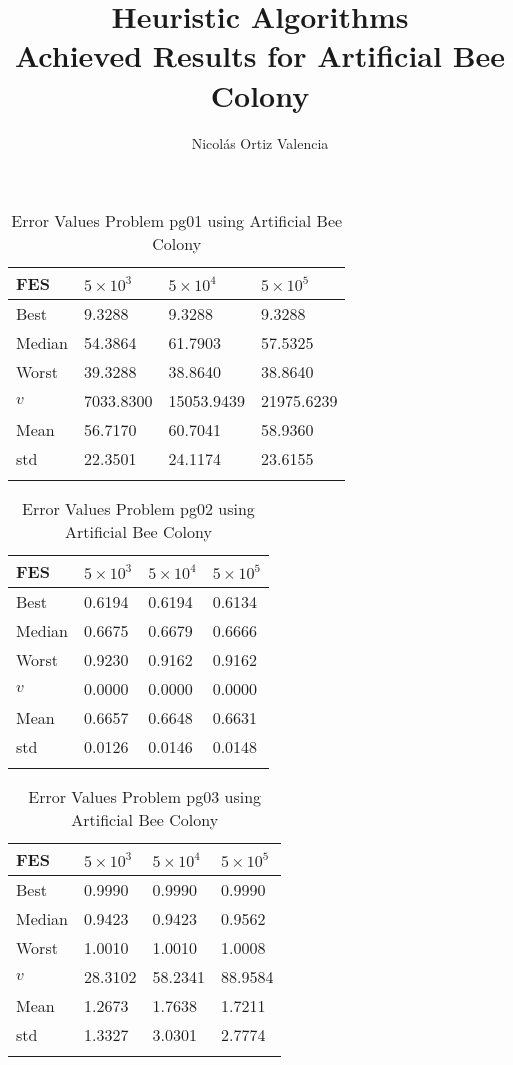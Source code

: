 \documentclass[10pt, a4paper]{book}
\title{
    Heuristic Algorithms \\
    \large Achieved Results for Artificial Bee Colony\\
}
\author{Nicolás Ortiz Valencia}
\begin{document}
\maketitle


\begin{center}
\begin{longtable}{l l l l}
FES & $5 \times 10^{3}$ & $5 \times 10^{4}$ & $5 \times 10^{5}$ \\
\hline
Best & 9.3288 & 9.3288 & 9.3288 \\
Median & 54.3864 & 61.7903 & 57.5325 \\
Worst & 39.3288 & 38.8640 & 38.8640 \\
$v$ & 7033.8300 & 15053.9439 & 21975.6239 \\
Mean & 56.7170 & 60.7041 & 58.9360 \\
std & 22.3501 & 24.1174 & 23.6155 \\
\caption{ Error Values Problem pg01 using Artificial Bee Colony }
\end{longtable}
\end{center}

\begin{center}
\begin{longtable}{l l l l}
FES & $5 \times 10^{3}$ & $5 \times 10^{4}$ & $5 \times 10^{5}$ \\
\hline
Best & 0.6194 & 0.6194 & 0.6134 \\
Median & 0.6675 & 0.6679 & 0.6666 \\
Worst & 0.9230 & 0.9162 & 0.9162 \\
$v$ & 0.0000 & 0.0000 & 0.0000 \\
Mean & 0.6657 & 0.6648 & 0.6631 \\
std & 0.0126 & 0.0146 & 0.0148 \\
\caption{ Error Values Problem pg02 using Artificial Bee Colony }
\end{longtable}
\end{center}

\begin{center}
\begin{longtable}{l l l l}
FES & $5 \times 10^{3}$ & $5 \times 10^{4}$ & $5 \times 10^{5}$ \\
\hline
Best & 0.9990 & 0.9990 & 0.9990 \\
Median & 0.9423 & 0.9423 & 0.9562 \\
Worst & 1.0010 & 1.0010 & 1.0008 \\
$v$ & 28.3102 & 58.2341 & 88.9584 \\
Mean & 1.2673 & 1.7638 & 1.7211 \\
std & 1.3327 & 3.0301 & 2.7774 \\
\caption{ Error Values Problem pg03 using Artificial Bee Colony }
\end{longtable}
\end{center}
\end{document}

